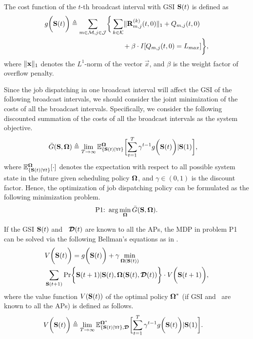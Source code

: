 \begin{definition}
    The cost function of the $t$-th broadcast interval with GSI $\mathbf{S}(t)$ is defined as
    {\small
    \begin{align}
        g\Paren{\Stat(t)} \define
            \sum_{m\in\esSet,j\in\jSpace}
            \Brace{&
                \sum_{k\in\apSet} \Inorm{\vec{R}^{(k)}_{m,j}(t,0)} + Q_{m,j}(t,0)
                \nonumber\\
                &~~~~~+ \beta \cdot I[Q_{m,j}(t,0)=L_{max}]
            },
    \end{align}
    }
    where $\lVert\mathbf{x}\|_1$ denotes the $L^1$-norm of the vector $\vec{x}$, and $\beta$ is the weight factor of overflow penalty.
\end{definition}

Since the job dispatching in one broadcast interval will affect the GSI of the following broadcast intervals, we should consider the joint minimization of the costs of all the broadcast intervals.
Specifically, we consider the following discounted summation of the costs of all the broadcast intervals as the system objective.
\begin{align}
    &\bar{G}(\Stat, \Policy) \define
    \lim_{T \to \infty} \mathbb{E}^{\Policy}_{\set{\Stat(t)|\forall t}}
    \Bracket{
        \sum_{t=1}^{T} \gamma^{t-1} g\Paren{\Stat(t)} | \Stat(1)
    },
\end{align}
where $\mathbb{E}^{\boldsymbol{\Omega}}_{\{\mathbf{S}(t)|\forall t\}}[\cdot]$ denotes the expectation with respect to all possible system state in the future given scheduling policy $\boldsymbol{\Omega}$, and $\gamma \in (0,1)$ is the discount factor.
Hence, the optimization of job dispatching policy can be formulated as the following minimization problem.
\begin{align}
    \text{P1:}~
    \arg\min_{\boldsymbol{\Omega}} \bar{G}(\mathbf{S}, \boldsymbol{\Omega}).
\end{align}

If the GSI $\mathbf{S}(t)$ and \brlatency~$\boldsymbol{\mathcal{D}}(t)$ are known to all the APs, the MDP in problem P1 can be solved via the following Bellman's equations as in \cite{sutton1998}.
\begin{align}
    &V\Paren{\Stat(t)} =g\Paren{\Stat(t)}
        + \gamma \min_{\Policy(\Stat(t))}
        \nonumber\\
        &\sum_{\Stat(t+1)} \Pr\Brace{ \Stat(t+1)|\Stat(t), \Policy(\Stat(t), \Delay(t)) } \cdot V\Paren{\Stat(t+1)},
    \label{eqn:sp_0}
\end{align}
where the value function $V(\mathbf{S}(t))$ of the optimal policy $\boldsymbol{\Omega}^{*}$ (if GSI and \brlatency~are known to all the APs) is defined as follows.
\begin{align}
    &V\Paren{\Stat(t)} \define
    \lim_{T\to\infty} 
    \mathbb{E}^{\Policy^*}_{\set{\Stat(t)|\forall t}, \Delay} \Bracket{
        \sum_{t=1}^{T} \gamma^{t-1} g\Paren{ \Stat(t) } | \Stat(1)
    }.
    \label{eqn:val_f}
\end{align}

